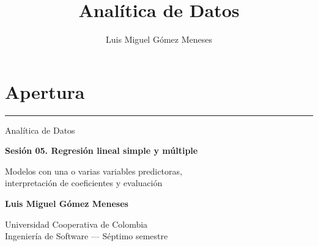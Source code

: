 \documentclass[aspectratio=169,11pt]{beamer}
\title{Analítica de Datos}
\author{Luis Miguel Gómez Meneses}
\institute{Universidad Cooperativa de Colombia}
\date{}
\begin{document}
\setlength{\parskip}{0pt}

\section{Apertura}


\begin{frame}[plain]

  \vspace{1.15cm}

  \hspace*{0.7cm}%
  \begin{minipage}{0.90\textwidth}

    \raggedright

    {\color{cAcc}\rule{2.6cm}{2.2pt}}\par

    \vspace{0.6em}

    {\Large\color{cGray}
      Analítica de Datos
    }\par

    \vspace{0.35em}

    {\LARGE\bfseries\color{cPrim}
      Sesión 05. Regresión lineal simple y múltiple
    }\par

    \vspace{0.9em}

    {\small\color{cInk}
      Modelos con una o varias variables predictoras,\\
      interpretación de coeficientes y evaluación
    }\par

    \vspace{1.5em}

    {\small\bfseries
      Luis Miguel Gómez Meneses
    }\par

    \vspace{0.3em}

    {\footnotesize\color{cGray}
      Universidad Cooperativa de Colombia\\
      Ingeniería de Software --- Séptimo semestre
    }\par

  \end{minipage}

\end{frame}
\end{document}
